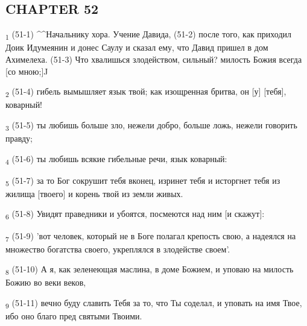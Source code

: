 \subsection{CHAPTER 52}
\begin{tcolorbox}
\textsubscript{1} (51-1) ^^Начальнику хора. Учение Давида, (51-2) после того, как приходил Доик Идумеянин и донес Саулу и сказал ему, что Давид пришел в дом Ахимелеха. (51-3) Что хвалишься злодейством, сильный? милость Божия всегда [со мною;]^^
\end{tcolorbox}
\begin{tcolorbox}
\textsubscript{2} (51-4) гибель вымышляет язык твой; как изощренная бритва, он [у] [тебя], коварный!
\end{tcolorbox}
\begin{tcolorbox}
\textsubscript{3} (51-5) ты любишь больше зло, нежели добро, больше ложь, нежели говорить правду;
\end{tcolorbox}
\begin{tcolorbox}
\textsubscript{4} (51-6) ты любишь всякие гибельные речи, язык коварный:
\end{tcolorbox}
\begin{tcolorbox}
\textsubscript{5} (51-7) за то Бог сокрушит тебя вконец, изринет тебя и исторгнет тебя из жилища [твоего] и корень твой из земли живых.
\end{tcolorbox}
\begin{tcolorbox}
\textsubscript{6} (51-8) Увидят праведники и убоятся, посмеются над ним [и скажут]:
\end{tcolorbox}
\begin{tcolorbox}
\textsubscript{7} (51-9) 'вот человек, который не в Боге полагал крепость свою, а надеялся на множество богатства своего, укреплялся в злодействе своем'.
\end{tcolorbox}
\begin{tcolorbox}
\textsubscript{8} (51-10) А я, как зеленеющая маслина, в доме Божием, и уповаю на милость Божию во веки веков,
\end{tcolorbox}
\begin{tcolorbox}
\textsubscript{9} (51-11) вечно буду славить Тебя за то, что Ты соделал, и уповать на имя Твое, ибо оно благо пред святыми Твоими.
\end{tcolorbox}
